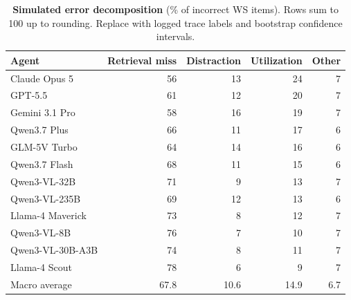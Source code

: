 \documentclass{article}
\newcommand{\placeholder}[1]{\textcolor{blue!65!black}{#1}}
\begin{document}
\begin{table}[h]
\centering
\scriptsize
\setlength{\tabcolsep}{4pt}
\begin{tabular}{lrrrr}
\toprule
Agent & Retrieval miss & Distraction & Utilization & Other\\
\midrule
Claude Opus 5 & \placeholder{56} & \placeholder{13} & \placeholder{24} & \placeholder{7}\\
GPT-5.5 & \placeholder{61} & \placeholder{12} & \placeholder{20} & \placeholder{7}\\
Gemini 3.1 Pro & \placeholder{58} & \placeholder{16} & \placeholder{19} & \placeholder{7}\\
Qwen3.7 Plus & \placeholder{66} & \placeholder{11} & \placeholder{17} & \placeholder{6}\\
GLM-5V Turbo & \placeholder{64} & \placeholder{14} & \placeholder{16} & \placeholder{6}\\
Qwen3.7 Flash & \placeholder{68} & \placeholder{11} & \placeholder{15} & \placeholder{6}\\
Qwen3-VL-32B & \placeholder{71} & \placeholder{9} & \placeholder{13} & \placeholder{7}\\
Qwen3-VL-235B & \placeholder{69} & \placeholder{12} & \placeholder{13} & \placeholder{6}\\
Llama-4 Maverick & \placeholder{73} & \placeholder{8} & \placeholder{12} & \placeholder{7}\\
Qwen3-VL-8B & \placeholder{76} & \placeholder{7} & \placeholder{10} & \placeholder{7}\\
Qwen3-VL-30B-A3B & \placeholder{74} & \placeholder{8} & \placeholder{11} & \placeholder{7}\\
Llama-4 Scout & \placeholder{78} & \placeholder{6} & \placeholder{9} & \placeholder{7}\\
\midrule
Macro average & \placeholder{67.8} & \placeholder{10.6} & \placeholder{14.9} & \placeholder{6.7}\\
\bottomrule
\end{tabular}
\caption{\textbf{Simulated error decomposition} (\% of incorrect WS items).
Rows sum to 100 up to rounding. Replace with logged trace labels and bootstrap
confidence intervals.}
\label{tab:error-full}
\end{table}
\end{document}
